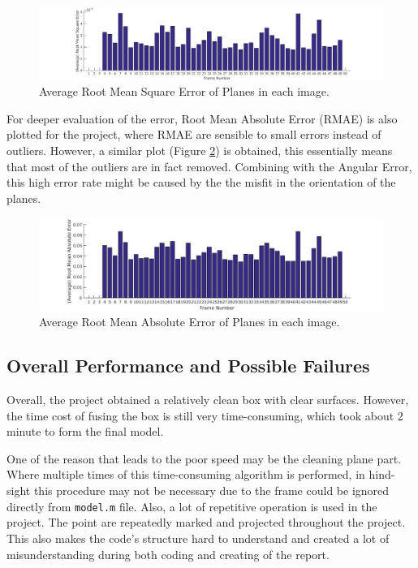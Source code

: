 \documentclass[10pt,a4paper]{article}
\begin{document}
\vspace{-10pt}
\hspace{-40pt}
\begin{figure}[!h]
		\includegraphics[scale=0.28]{armse.jpg}
		\caption{ \small Average Root Mean Square Error of Planes in each image.}
		\label{fig:e4}
\end{figure}

For deeper evaluation of the error, Root Mean Absolute Error (RMAE) is also plotted for the project, where RMAE are sensible to small errors instead of outliers.
However, a similar plot (Figure \ref{fig:e5}) is obtained, this essentially means that most of the outliers are in fact removed. 
Combining with the Angular Error, this high error rate might be caused by the the misfit in the orientation of the planes.

\vspace{-10pt}
\hspace{-40pt}
\begin{figure}[!h]
		\includegraphics[scale=0.36]{armae.jpg}
		\caption{ \small Average Root Mean Absolute Error of Planes in each image.}
		\label{fig:e5}
\end{figure}



\subsection{Overall Performance and Possible Failures}

Overall, the project obtained a relatively clean box with clear surfaces.
However, the time cost of fusing the box is still very time-consuming, which took about 2 minute to form the final model.

One of the reason that leads to the poor speed may be the cleaning plane part. 
Where multiple times of this time-consuming algorithm is performed, in hind-sight this procedure may not be necessary due to the frame could be ignored directly from {\tt model.m} file.
Also, a lot of repetitive operation is used in the project.
The point are repeatedly marked and projected throughout the project.
This also makes the code's structure hard to understand and created a lot of misunderstanding during both coding and creating of the report.
\end{document}
